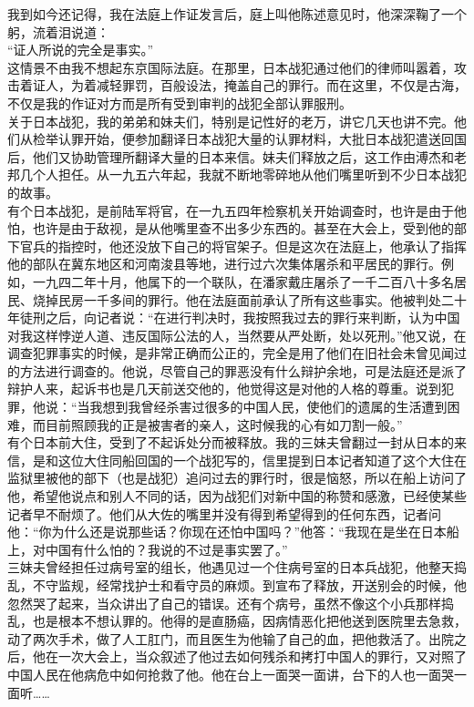 我到如今还记得，我在法庭上作证发言后，庭上叫他陈述意见时，他深深鞠了一个躬，流着泪说道：\\

“证人所说的完全是事实。”\\

这情景不由我不想起东京国际法庭。在那里，日本战犯通过他们的律师叫嚣着，攻击着证人，为着减轻罪罚，百般设法，掩盖自己的罪行。而在这里，不仅是古海，不仅是我的作证对方而是所有受到审判的战犯全部认罪服刑。\\

关于日本战犯，我的弟弟和妹夫们，特别是记性好的老万，讲它几天也讲不完。他们从检举认罪开始，便参加翻译日本战犯大量的认罪材料，大批日本战犯遣送回国后，他们又协助管理所翻译大量的日本来信。妹夫们释放之后，这工作由溥杰和老邦几个人担任。从一九五六年起，我就不断地零碎地从他们嘴里听到不少日本战犯的故事。\\

有个日本战犯，是前陆军将官，在一九五四年检察机关开始调查时，也许是由于他怕，也许是由于敌视，是从他嘴里查不出多少东西的。甚至在大会上，受到他的部下官兵的指控时，他还没放下自己的将官架子。但是这次在法庭上，他承认了指挥他的部队在冀东地区和河南浚县等地，进行过六次集体屠杀和平居民的罪行。例如，一九四二年十月，他属下的一个联队，在潘家戴庄屠杀了一千二百八十多名居民、烧掉民房一千多间的罪行。他在法庭面前承认了所有这些事实。他被判处二十年徒刑之后，向记者说：“在进行判决时，我按照我过去的罪行来判断，认为中国对我这样悖逆人道、违反国际公法的人，当然要从严处断，处以死刑。”他又说，在调查犯罪事实的时候，是非常正确而公正的，完全是用了他们在旧社会未曾见闻过的方法进行调查的。他说，尽管自己的罪恶没有什么辩护余地，可是法庭还是派了辩护人来，起诉书也是几天前送交他的，他觉得这是对他的人格的尊重。说到犯罪，他说：“当我想到我曾经杀害过很多的中国人民，使他们的遗属的生活遭到困难，而目前照顾我的正是被害者的亲人，这时候我的心有如刀割一般。”\\

有个日本前大住，受到了不起诉处分而被释放。我的三妹夫曾翻过一封从日本的来信，是和这位大住同船回国的一个战犯写的，信里提到日本记者知道了这个大住在监狱里被他的部下（也是战犯）追问过去的罪行时，很是恼怒，所以在船上访问了他，希望他说点和别人不同的话，因为战犯们对新中国的称赞和感激，已经使某些记者早不耐烦了。他们从大佐的嘴里并没有得到希望得到的任何东西，记者问他：“你为什么还是说那些话？你现在还怕中国吗？”他答：“我现在是坐在日本船上，对中国有什么怕的？我说的不过是事实罢了。”\\

三妹夫曾经担任过病号室的组长，他遇见过一个住病号室的日本兵战犯，他整天捣乱，不守监规，经常找护士和看守员的麻烦。到宣布了释放，开送别会的时候，他忽然哭了起来，当众讲出了自己的错误。还有个病号，虽然不像这个小兵那样捣乱，也是根本不想认罪的。他得的是直肠癌，因病情恶化把他送到医院里去急救，动了两次手术，做了人工肛门，而且医生为他输了自己的血，把他救活了。出院之后，他在一次大会上，当众叙述了他过去如何残杀和拷打中国人的罪行，又对照了中国人民在他病危中如何抢救了他。他在台上一面哭一面讲，台下的人也一面哭一面听……\\

